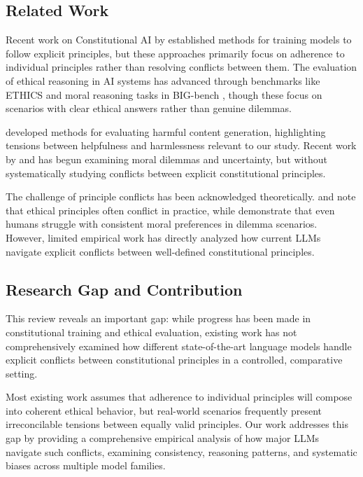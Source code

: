 \documentclass[11pt,a4paper]{article}
\begin{document}
\subsection{Related Work}

Recent work on Constitutional AI by \citet{anthropic2022constitutional} established methods for training models to follow explicit principles, but these approaches primarily focus on adherence to individual principles rather than resolving conflicts between them. The evaluation of ethical reasoning in AI systems has advanced through benchmarks like ETHICS \citep{hendrycks2020measuring} and moral reasoning tasks in BIG-bench \citep{srivastava2022beyond}, though these focus on scenarios with clear ethical answers rather than genuine dilemmas.

\citet{gehman2020realtoxicityprompts} developed methods for evaluating harmful content generation, highlighting tensions between helpfulness and harmlessness relevant to our study. Recent work by \citet{jin2022moral} and \citet{emelin2021moral} has begun examining moral dilemmas and uncertainty, but without systematically studying conflicts between explicit constitutional principles.

The challenge of principle conflicts has been acknowledged theoretically. \citet{floridi2019translating} and \citet{jobin2019global} note that ethical principles often conflict in practice, while \citet{bonnefon2016social} demonstrate that even humans struggle with consistent moral preferences in dilemma scenarios. However, limited empirical work has directly analyzed how current LLMs navigate explicit conflicts between well-defined constitutional principles.

\subsection{Research Gap and Contribution}

This review reveals an important gap: while progress has been made in constitutional training and ethical evaluation, existing work has not comprehensively examined how different state-of-the-art language models handle explicit conflicts between constitutional principles in a controlled, comparative setting.

Most existing work assumes that adherence to individual principles will compose into coherent ethical behavior, but real-world scenarios frequently present irreconcilable tensions between equally valid principles. Our work addresses this gap by providing a comprehensive empirical analysis of how major LLMs navigate such conflicts, examining consistency, reasoning patterns, and systematic biases across multiple model families.
\end{document}
